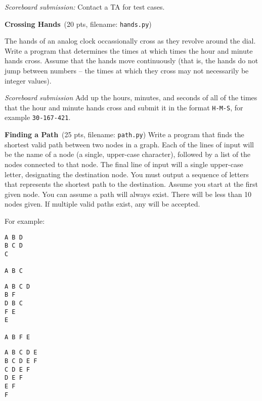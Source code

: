 \documentclass[11pt]{cselabheader}
\newcommand{\cop}[3]{\textbf{#1}~(#2 pts, filename: \texttt{#3})\quad}
\theoremstyle{plain}
\begin{document}
\begin{enumerate}
    \textit{Scoreboard submission:} Contact a TA for test cases.

  \item \cop{Crossing Hands}{20}{hands.py}

    The hands of an analog clock occassionally cross as they revolve around
    the dial. Write a program that determines the times at which times the 
    hour and minute hands cross. Assume that
    the hands move continuously (that is, the hands do not jump between
    numbers -- the times at which they cross may not necessarily be
    integer values).

    \textit{Scoreboard submission} Add up the hours, minutes, and seconds
    of all of the times that the hour and minute hands cross
    and submit it in the format \texttt{H-M-S}, 
    for example \texttt{30-167-421}.

  \item \cop{Finding a Path}{25}{path.py}
    Write a program that finds the shortest valid path between two nodes in a graph.
    Each of the lines of input will be the name of a node (a single, upper-case
    character), followed by a list of the nodes connected to that node. The final
    line of input will a single upper-case letter, designating the destination node.
    You must output a sequence of letters that represents the shortest path to the
    destination. Assume you start at the first given node. You can assume a path will
    always exist. There will be less than 10 nodes given. If multiple valid paths
    exist, any will be accepted.
    
    For example:\\
    \begin{minipage}{.33\linewidth}
      \begin{minipage}{.8\linewidth}
        \begin{lstlisting}[style=bash]
A B D
B C D
C

A B C
        \end{lstlisting}
      \end{minipage}
    \end{minipage}
    \begin{minipage}{.33\linewidth}
      \begin{minipage}{.8\linewidth}
        \begin{lstlisting}[style=bash]
A B C D
B F
D B C
F E
E

A B F E
        \end{lstlisting}
      \end{minipage}
    \end{minipage}
    \begin{minipage}{.33\linewidth}
      \begin{minipage}{.8\linewidth}
        \begin{lstlisting}[style=bash]
A B C D E
B C D E F
C D E F
D E F
E F
F


\end{lstlisting}
\end{minipage}
\end{minipage}
\end{enumerate}
\end{document}
